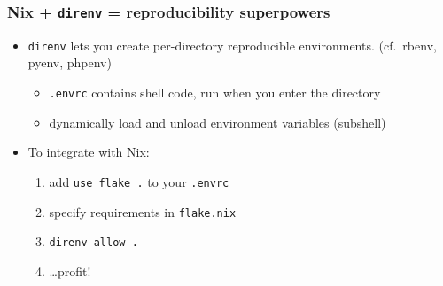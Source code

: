 \documentclass[nochapters]{otagoslides}
\begin{document}


\begin{frame}
    \frametitle{Nix + \texttt{direnv} = reproducibility superpowers}

    \begin{itemize}
        \item \texttt{direnv} lets you create per-directory reproducible environments. \tinyskip
        {\tiny (cf.\ rbenv, pyenv, phpenv)}
        \begin{itemize}
            \item \texttt{.envrc} contains shell code, run when you enter the directory
            \item dynamically load and unload environment variables {\tiny (subshell)}
        \end{itemize}
        \item To integrate with Nix:
        \begin{enumerate}
            \item add \texttt{use flake .} to your \texttt{.envrc}
            \item specify requirements in \texttt{flake.nix}
            \item \texttt{direnv allow .}
            \item \ldots profit!
        \end{enumerate}
    \end{itemize}
\end{frame}


\end{document}
